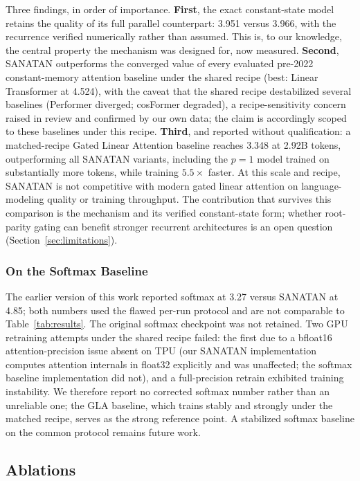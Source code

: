 \documentclass{article}
\begin{document}
Three findings, in order of importance. \textbf{First}, the exact constant-state model retains the quality of its full parallel counterpart: 3.951 versus 3.966, with the recurrence verified numerically rather than assumed. This is, to our knowledge, the central property the mechanism was designed for, now measured. \textbf{Second}, SANATAN outperforms the converged value of every evaluated pre-2022 constant-memory attention baseline under the shared recipe (best: Linear Transformer at 4.524), with the caveat that the shared recipe destabilized several baselines (Performer diverged; cosFormer degraded), a recipe-sensitivity concern raised in review and confirmed by our own data; the claim is accordingly scoped to these baselines under this recipe. \textbf{Third}, and reported without qualification: a matched-recipe Gated Linear Attention baseline reaches 3.348 at 2.92B tokens, outperforming all SANATAN variants, including the $p=1$ model trained on substantially more tokens, while training $5.5\times$ faster. At this scale and recipe, SANATAN is not competitive with modern gated linear attention on language-modeling quality or training throughput. The contribution that survives this comparison is the mechanism and its verified constant-state form; whether root-parity gating can benefit stronger recurrent architectures is an open question (Section~\ref{sec:limitations}).

\subsubsection{On the Softmax Baseline}
\label{sec:softmax-note}

The earlier version of this work reported softmax at 3.27 versus SANATAN at 4.85; both numbers used the flawed per-run protocol and are not comparable to Table~\ref{tab:results}. The original softmax checkpoint was not retained. Two GPU retraining attempts under the shared recipe failed: the first due to a bfloat16 attention-precision issue absent on TPU (our SANATAN implementation computes attention internals in float32 explicitly and was unaffected; the softmax baseline implementation did not), and a full-precision retrain exhibited training instability. We therefore report no corrected softmax number rather than an unreliable one; the GLA baseline, which trains stably and strongly under the matched recipe, serves as the strong reference point. A stabilized softmax baseline on the common protocol remains future work.

\subsection{Ablations}
\end{document}
